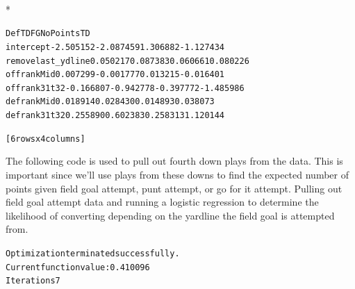 \documentclass[letterpaper,10pt,english]{/anaconda/lib/python2.7/site-packages/sphinx/texinputs/sphinxhowto}
\def\smaller{\fontsize{9.5pt}{9.5pt}\selectfont}
\newenvironment{InvisibleVerbatim}
        {\begin{mdframed}[leftmargin=0.1\linewidth,innerleftmargin=3pt,innerrightmargin=3pt, userdefinedwidth=1\linewidth, linewidth=0pt, linecolor=white, usetwoside=false]}
        {\end{mdframed}}
\begin{document}
                \makebox[0.1\linewidth]{\smaller\hfill\tt\color{nbframe-out-prompt}Out\hspace{4pt}{[}15{]}:\hspace{4pt}}\\*
                \vspace{-2.55\baselineskip}\begin{InvisibleVerbatim}
                \vspace{-0.5\baselineskip}
\begin{alltt}                      DefTD        FG  NoPoints        TD
intercept         -2.505152 -2.087459  1.306882 -1.127434
removelast\_ydline  0.050217  0.087383  0.060661  0.080226
offrankMid         0.007299 -0.001777  0.013215 -0.016401
offrank31t32      -0.166807 -0.942778 -0.397772 -1.485986
defrankMid         0.018914  0.028430  0.014893  0.038073
defrank31t32       0.255890  0.602383  0.258313  1.120144

[6 rows x 4 columns]\end{alltt}

            \end{InvisibleVerbatim}
            
        
    
The following code is used to pull out fourth down plays from the data.
This is important since we'll use plays from these downs to find the
expected number of points given field goal attempt, punt attempt, or go
for it attempt.
Pulling out field goal attempt data and running a logistic regression to
determine the likelihood of converting depending on the yardline the
field goal is attempted from.

    

        
        

            
                \begin{InvisibleVerbatim}
                \vspace{-0.5\baselineskip}
\begin{alltt}Optimization terminated successfully.
         Current function value: 0.410096
         Iterations 7
\end{alltt}

            \end{InvisibleVerbatim}
            
\end{document}
